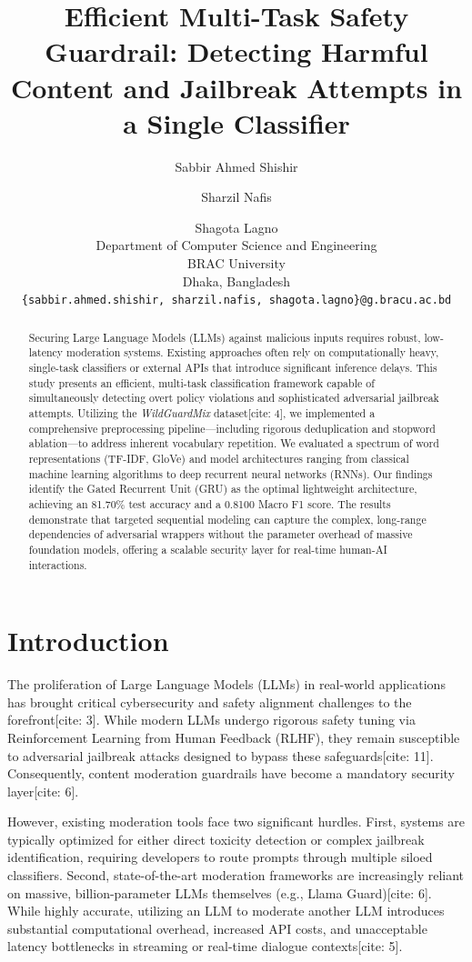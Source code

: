 \documentclass[11pt]{article}
\title{Efficient Multi-Task Safety Guardrail: Detecting Harmful Content and Jailbreak Attempts in a Single Classifier}
\author{Sabbir Ahmed Shishir \and Sharzil Nafis \and Shagota Lagno \\
  Department of Computer Science and Engineering \\
  BRAC University \\
  Dhaka, Bangladesh \\
  \texttt{\{sabbir.ahmed.shishir, sharzil.nafis, shagota.lagno\}@g.bracu.ac.bd}}
\begin{document}
\maketitle

\begin{abstract}
Securing Large Language Models (LLMs) against malicious inputs requires robust, low-latency moderation systems. Existing approaches often rely on computationally heavy, single-task classifiers or external APIs that introduce significant inference delays. This study presents an efficient, multi-task classification framework capable of simultaneously detecting overt policy violations and sophisticated adversarial jailbreak attempts. Utilizing the \textit{WildGuardMix} dataset[cite: 4], we implemented a comprehensive preprocessing pipeline—including rigorous deduplication and stopword ablation—to address inherent vocabulary repetition. We evaluated a spectrum of word representations (TF-IDF, GloVe) and model architectures ranging from classical machine learning algorithms to deep recurrent neural networks (RNNs). Our findings identify the Gated Recurrent Unit (GRU) as the optimal lightweight architecture, achieving an 81.70\% test accuracy and a 0.8100 Macro F1 score. The results demonstrate that targeted sequential modeling can capture the complex, long-range dependencies of adversarial wrappers without the parameter overhead of massive foundation models, offering a scalable security layer for real-time human-AI interactions.
\end{abstract}

\section{Introduction}
The proliferation of Large Language Models (LLMs) in real-world applications has brought critical cybersecurity and safety alignment challenges to the forefront[cite: 3]. While modern LLMs undergo rigorous safety tuning via Reinforcement Learning from Human Feedback (RLHF), they remain susceptible to adversarial jailbreak attacks designed to bypass these safeguards[cite: 11]. Consequently, content moderation guardrails have become a mandatory security layer[cite: 6]. 

However, existing moderation tools face two significant hurdles. First, systems are typically optimized for either direct toxicity detection or complex jailbreak identification, requiring developers to route prompts through multiple siloed classifiers. Second, state-of-the-art moderation frameworks are increasingly reliant on massive, billion-parameter LLMs themselves (e.g., Llama Guard)[cite: 6]. While highly accurate, utilizing an LLM to moderate another LLM introduces substantial computational overhead, increased API costs, and unacceptable latency bottlenecks in streaming or real-time dialogue contexts[cite: 5].
\end{document}
